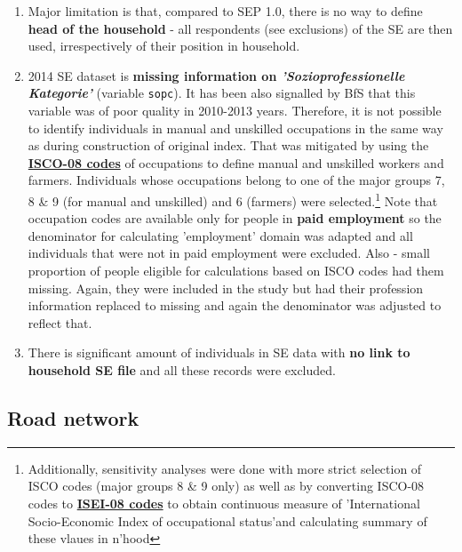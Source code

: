 \documentclass[a4paper, notitlepage, fleqn]{article} %
\begin{document}
\begin{enumerate}

	\item Major limitation is that, compared to SEP 1.0, there is no way to define \textbf{head of the household} - 
		all respondents (see exclusions) of the SE are then used, irrespectively of their position in household.
		
	\item 2014 SE dataset is \textbf{missing information on \textit{'Sozioprofessionelle Kategorie'}} (variable \texttt{sopc}).  
		It has been also signalled by BfS that this variable was of poor quality in 2010-2013 years. 
		Therefore, it is not possible to identify individuals in manual and unskilled occupations in the same way as during 
		construction of original index. That was mitigated by using the 
		\href{http://www.ilo.org/public/english/bureau/stat/isco/isco08/index.htm}{\textbf{ISCO-08 codes}} of occupations 
		to define manual and unskilled workers and farmers.
		Individuals whose occupations belong to one of the major groups 7, 8 \& 9 (for manual and unskilled) and 6 (farmers) were selected.\footnote{Additionally, 
		sensitivity analyses were done with more strict selection of ISCO codes (major groups 8 \& 9 only) as well as 	
		by converting ISCO-08 codes to \href{http://www.harryganzeboom.nl/isco08/qa-isei-08.htm}{\textbf{ISEI-08 codes}} 
		to obtain continuous measure of 'International Socio-Economic Index of occupational status'and calculating summary of these vlaues in n'hood} 				
		Note that occupation codes are available only for people in \textbf{paid employment} so the denominator 
		for calculating 'employment' domain was adapted and all individuals that were not in paid employment were excluded.	
		Also - small proportion of people eligible for calculations based on ISCO codes had them missing. Again, they were included in the study
		but had their profession information replaced to missing and again the denominator was adjusted to reflect that.
		
	\item There is significant amount of individuals in SE data with \textbf{no link to household SE file} and all these records were excluded. 
	
\end{enumerate}
\newpage
\subsection{Road network}
\end{document}
